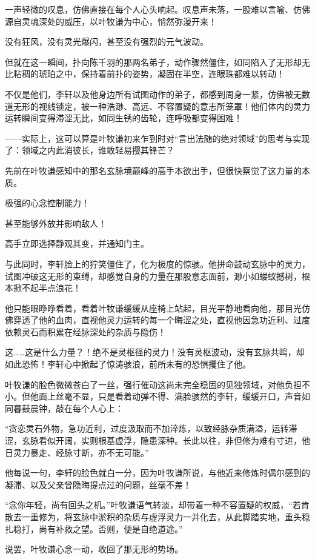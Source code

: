 一声轻微的叹息，仿佛直接在每个人心头响起。叹息声未落，一股难以言喻、仿佛源自灵魂深处的威压，以叶牧谦为中心，悄然弥漫开来！

没有狂风，没有灵光爆闪，甚至没有强烈的元气波动。

但就在这一瞬间，扑向陈千羽的那两名弟子，动作骤然僵住，如同陷入了无形却无比粘稠的琥珀之中，保持着前扑的姿势，凝固在半空，连眼珠都难以转动！

不仅是他们，李轩以及他身边所有试图动作的弟子，都感到周身一紧，仿佛被无数道无形的视线锁定，被一种浩渺、高远、不容置疑的意志所笼罩！他们体内的灵力运转瞬间变得滞涩无比，如同生锈的齿轮，连呼吸都变得困难！

——实际上，这可以算是叶牧谦初来乍到时对“言出法随的绝对领域”的思考与实现了：领域之内此消彼长，谁敢轻易撄其锋芒？

先前在叶牧谦感知中的那名玄脉境巅峰的高手本欲出手，但很快察觉了这力量的本质。

极强的心念控制能力！

甚至能够外放并影响敌人！

高手立即选择静观其变，并通知门主。

与此同时，李轩脸上的狞笑僵住了，化为极度的惊骇。他拼命鼓动玄脉中的灵力，试图冲破这无形的束缚，却感觉自身的力量在那股意志面前，渺小如蝼蚁撼树，根本掀不起半点浪花！

他只能眼睁睁看着，看着叶牧谦缓缓从座椅上站起，目光平静地看向他，那目光仿佛穿透了他的血肉，直视他灵力运转的每一个晦涩之处，直视他因急功近利、过度依赖灵石而积累在经脉深处的杂质与隐伤！

这……这是什么力量？！绝不是灵枢径的灵力！没有灵枢波动，没有玄脉共鸣，却如此恐怖！李轩心中掀起了惊涛骇浪，前所未有的恐惧攫住了他。

叶牧谦的脸色微微苍白了一丝，强行催动这尚未完全稳固的见独领域，对他负担不小。但他面上丝毫不显，只是看着动弹不得、满脸骇然的李轩，缓缓开口，声音如同暮鼓晨钟，敲在每个人心上：

“贪恋灵石外物，急功近利，过度汲取而不加淬炼，以致经脉杂质满溢，运转滞涩，玄脉看似开阔，实则根基虚浮，隐患深种。长此以往，非但修为难有寸进，他日灵力暴走、经脉寸断，亦不无可能。”

他每说一句，李轩的脸色就白一分，因为叶牧谦所说，与他近来修炼时偶尔感到的凝滞、以及父亲曾隐晦提点过的问题，丝毫不差！

“念你年轻，尚有回头之机。”叶牧谦语气转淡，却带着一种不容置疑的权威，“若肯散去一重修为，将玄脉中淤积的杂质与虚浮灵力一并化去，从此脚踏实地，重头稳扎稳打，尚有补救之望。否则，便是自绝道途。”

说罢，叶牧谦心念一动，收回了那无形的势场。


